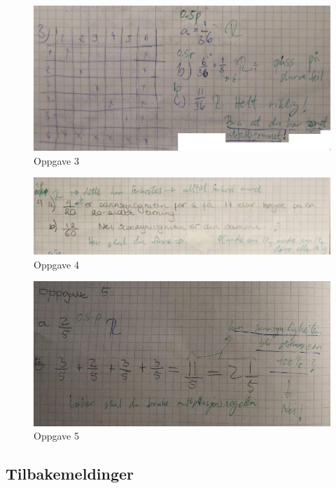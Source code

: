 \documentclass[main.tex]{subfiles}
\begin{document}
\begin{figure}
\centering
\includegraphics[scale = 0.4]{../figures/maryam2.png}
\caption{Oppgave 3}
\label{fig:maryam2}
\end{figure}

\begin{figure}
\centering
\includegraphics[scale = 0.4]{../figures/maria.png}
\caption{Oppgave 4}
\label{fig:maria}
\end{figure}

\begin{figure}
\centering
\includegraphics[scale = 0.4]{../figures/mohsin.png}
\caption{Oppgave 5}
\label{fig:mohsin}
\end{figure}


\subsection*{Tilbakemeldinger}
\end{document}
